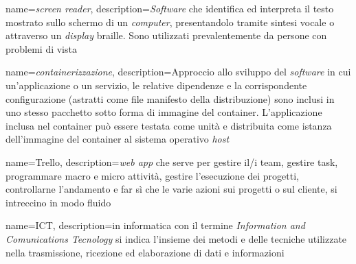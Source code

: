 {
    name={\textit{screen reader}},
    description={\textit{Software} che identifica ed interpreta il testo mostrato sullo schermo di un \textit{computer}, presentandolo tramite sintesi vocale o attraverso un \textit{display} braille. Sono utilizzati prevalentemente da persone con problemi di vista}
}



{
    name={\textit{containerizzazione}},
    description={Approccio allo sviluppo del \textit{software} in cui un'applicazione o un servizio, le relative dipendenze e la corrispondente configurazione (astratti come file manifesto della distribuzione) sono inclusi in uno stesso pacchetto sotto forma di immagine del \gls{container}. L'applicazione inclusa nel \gls{container} può essere testata come unità e distribuita come istanza dell'immagine del \gls{container} al sistema operativo \textit{host}}
}

{
    name={Trello},
    description={\textit{web app} che serve per gestire il/i team, gestire task, programmare macro e micro attività, gestire l'esecuzione dei progetti, controllarne l'andamento e far sì che le varie azioni sui progetti o sul cliente, si intreccino in modo fluido}
}

{
    name={ICT},
    description={in informatica con il termine \textit{Information and Comunications Tecnology} 
    si indica l'insieme dei metodi e delle tecniche utilizzate nella trasmissione, ricezione 
    ed elaborazione di dati e informazioni}
}


